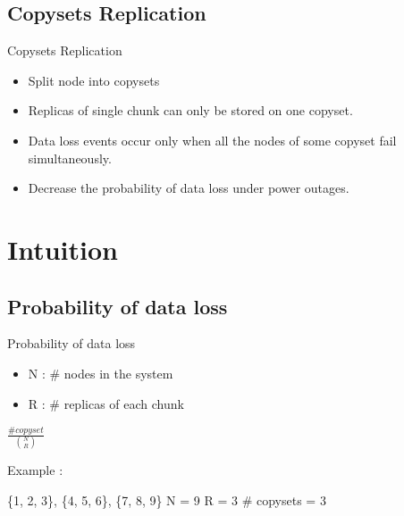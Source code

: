 \documentclass[xcolor=table]{beamer}
\begin{document}
	\subsection{Copysets Replication}
	\begin{frame}{Copysets Replication}
		\begin{itemize}
			\item Split node into \alert{copysets}
			\item Replicas of single chunk can only be stored on \alert{one copyset}.
			\item Data loss events occur only when all the nodes of some copyset fail \alert{simultaneously}.
			\item \alert{Decrease} the probability of data loss under power outages.
		\end{itemize}
	\end{frame}

	\section{Intuition}

	\subsection{Probability of data loss}
	\begin{frame}{Probability of data loss}
		\begin{minipage}[h]{0.49\linewidth}
			\centering
			\small
			\begin{itemize}
				\item N : \# nodes in the system
				\item R : \# replicas of each chunk
			\end{itemize}
		\end{minipage}
		\begin{minipage}[h]{0.49\linewidth}
			\centering
			\Huge
			$\frac{\# copyset}{\binom{N}{R}}$
		\end{minipage}
		\newline
		\newline
		Example :
		\begin{center}
			\alert{\{1, 2, 3\}, \{4, 5, 6\}, \{7, 8, 9\}}
			\newline
			\newline
			N = 9\newline
			R = 3
			\newline
			\newline
			\# copysets = 3
			\newline
		\end{center}
	\end{frame}
\end{document}
